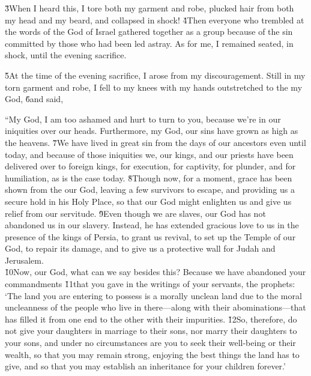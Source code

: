 \v{3}When I heard this, I tore both my garment and robe, plucked hair from both my head and my beard, and collapsed in shock! \v{4}Then everyone who trembled at the words of the God of Israel gathered together as a group because of the sin committed by those who had been led astray. As for me, I remained seated, in shock, until the evening sacrifice.

\v{5}At the time of the evening sacrifice, I arose from my discouragement. Still in my torn garment and robe, I fell to my knees with my hands outstretched to the  my God, \v{6}and said,

\begin{poetry}
\poeml ``My God, I am too ashamed and hurt to turn to you, because we're in our iniquities over our heads. Furthermore, my God, our sins have grown as high as the heavens. \v{7}We have lived in great sin from the days of our ancestors even until today, and because of those iniquities we, our kings, and our priests have been delivered over to foreign kings, for execution, for captivity, for plunder, and for humiliation, as is the case today. \v{8}Though now, for a moment, grace has been shown from the  our God, leaving a few survivors to escape, and providing us a secure hold in his Holy Place, so that our God might enlighten us and give us relief from our servitude. \v{9}Even though we are slaves, our God has not abandoned us in our slavery. Instead, he has extended gracious love to us in the presence of the kings of Persia, to grant us revival, to set up the Temple of our God, to repair its damage, and to give us a protective wall for Judah and Jerusalem. \\
\poeml \v{10}Now, our God, what can we say besides this? Because we have abandoned your commandments \v{11}that you gave in the writings of your servants, the prophets: \\
\poeml `The land you are entering to possess is a morally unclean land due to the moral uncleanness of the people who live in there---along with their abominations---that has filled it from one end to the other with their impurities. \v{12}So, therefore, do not give your daughters in marriage to their sons, nor marry their daughters to your sons, and under no circumstances are you to seek their well-being or their wealth, so that you may remain strong, enjoying the best things the land has to give, and so that you may establish an inheritance for your children forever.' \\

\end{poetry}
